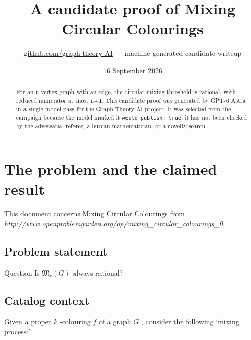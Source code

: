 \documentclass[
  11pt,
  a4paper,
]{article}
\title{A candidate proof of Mixing Circular Colourings}
\author{\href{https://github.com/graph-theory-AI}{github.com/graph-theory-AI}
--- machine-generated candidate writeup}
\date{16 September 2026}
\begin{document}
\maketitle
\begin{abstract}
For an n-vertex graph with an edge, the circular mixing threshold is
rational, with reduced numerator at most n+1. This candidate proof was
generated by GPT-6 Astra in a single model pass for the Graph Theory AI
project. It was selected from the campaign because the model marked it
\texttt{would\_publish:\ true}; it has not been checked by the
adversarial referee, a human mathematician, or a novelty search.
\end{abstract}

\section{The problem and the claimed
result}\label{the-problem-and-the-claimed-result}

This document concerns
\href{https://graph-theory-ai.github.io/graph-conjectures/op/mixing_circular_colourings_0/}{Mixing
Circular Colourings} from
\emph{http://www.openproblemgarden.org/op/mixing\_circular\_colourings\_0}.

\subsection{Problem statement}\label{problem-statement}

Question Is \(\mathfrak{M}_c(G)\) always rational?

\subsection{Catalog context}\label{catalog-context}

Given a proper \(k\) -colouring \(f\) of a graph \(G\) , consider the
following `mixing process:'
\end{document}
